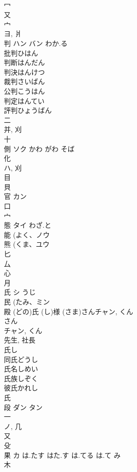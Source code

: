 \documentclass[8pt]{extreport}
\begin{document}
\begin{CJK}{UTF8}{min}
\\	冖 
\\	又 
\\	宀 
\\	ヨ, 爿 
\\	判	ハン バン	わか.る	
\\	批判ひはん 
\\	判断はんだん 
\\	判決はんけつ 
\\	裁判さいばん 
\\	公判こうはん 
\\	判定はんてい 
\\	評判ひょうばん 
\\	二 
\\	并, 刈 
\\	十 
\\	側	ソク	かわ がわ そば	
\\	化 
\\	ハ, 刈 
\\	目 
\\	貝 
\\	官	カン		
\\	口 
\\	宀 
\\	態	タイ	わざ.と	
\\	能 (よく、ノウ 
\\	熊 (くま、ユウ 
\\	匕 
\\	厶 
\\	心 
\\	月 
\\	氏	シ	うじ	
\\	民 (たみ、ミン 
\\	殿 (どの)氏 (し)様 (さま)さんチャン, くん 
\\	さん 
\\	チャン, くん 
\\	先生, 社長 
\\	氏し 
\\	同氏どうし 
\\	氏名しめい 
\\	氏族しぞく 
\\	彼氏かれし 
\\	氏 
\\	段	ダン タン		
\\	一 
\\	ノ, 几 
\\	又 
\\	殳 
\\	果	カ	は.たす はた.す は.てる は.て み	
\\	木 

\end{CJK}
\end{document}
